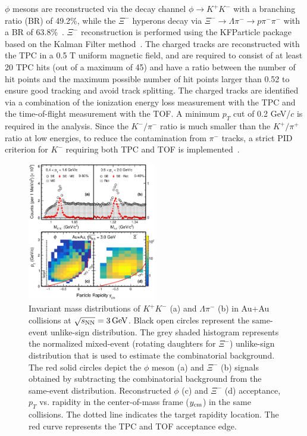 \documentclass[%
 reprint,	
showpacs,
 amsmath,amssymb,
 aps,
 superscriptaddress,
]{revtex4-1}
\begin{document}
$\phi$ mesons are reconstructed via the decay channel $\phi\rightarrow K^+K^-$ with a branching ratio (BR) of 49.2\%, while the $\Xi^{-}$ hyperons decay via $\Xi^-\rightarrow \Lambda\pi^-\rightarrow p\pi^-\pi^-$ with a BR of 63.8\%~\cite{pdg}. $\Xi^-$ reconstruction is performed using the KFParticle package based on the Kalman Filter method~\cite{Kisel:2018nvd,STAR_PRL_Xi_Oemga_polarization}. The charged tracks are reconstructed with the TPC in a 0.5 T uniform magnetic field, and are required to consist of at least 20 TPC hits (out of a maximum of 45) and have a ratio between the number of hit points and the maximum possible number of hit points larger than 0.52 to ensure good tracking and avoid track splitting. %
The charged tracks are identified via a combination of the ionization energy loss %
measurement with the TPC and the time-of-flight %
measurement with the TOF. A minimum $p_T$ cut of 0.2 GeV/$c$ is required in the analysis.
Since the $K^{-}/\pi^{-}$ ratio is much smaller than the $K^{+}/\pi^{+}$ ratio at low energies, to reduce the contamination from $\pi^{-}$ tracks, a strict PID criterion for $K^{-}$ requiring both TPC and TOF is implemented~\cite{Xu:2008th,Shao:2005iu}.



\begin{figure}
\centering
\hspace*{-4mm}
\includegraphics[width=0.50\textwidth]{fig1_signal.eps}
  \caption{Invariant mass distributions of $K^+K^-$ (a) and  $\Lambda\pi^-$ (b) in Au+Au collisions at ${\sqrt{s_{\rm NN}} = \rm{3\,GeV}}$. Black open circles represent the same-event unlike-sign distribution. The grey shaded histogram represents the normalized mixed-event (rotating daughters for $\Xi^-$) unlike-sign distribution that is used to estimate the combinatorial background. The red solid circles depict the $\phi$ meson (a) and $\Xi^-$ (b) signals obtained by subtracting the combinatorial background from the same-event distribution. Reconstructed $\phi$ (c) and $\Xi^-$ (d) acceptance, $p_T$ vs. rapidity in the center-of-mass frame ($y_{\rm cm}$) in the same collisions. The dotted line indicates the target rapidity location. The red curve represents the TPC and TOF acceptance edge.}
\label{fig:phiSignal} 
\end{figure}
\end{document}

